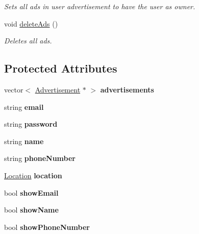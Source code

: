 \begin{DoxyCompactItemize}
\begin{DoxyCompactList}\small\item\em Sets all ads in user advertisement to have the user as owner. \end{DoxyCompactList}\item 
\hypertarget{class_user_a9e9f5d5cc0627f130ff2739ea57d3366}{}void \hyperlink{class_user_a9e9f5d5cc0627f130ff2739ea57d3366}{delete\+Ads} ()\label{class_user_a9e9f5d5cc0627f130ff2739ea57d3366}

\begin{DoxyCompactList}\small\item\em Deletes all ads. \end{DoxyCompactList}\end{DoxyCompactItemize}
\subsection*{Protected Attributes}
\begin{DoxyCompactItemize}
\item 
\hypertarget{class_user_a9a78e0f9ab50c5d9d3041d1d90acd4d8}{}vector$<$ \hyperlink{class_advertisement}{Advertisement} $\ast$ $>$ {\bfseries advertisements}\label{class_user_a9a78e0f9ab50c5d9d3041d1d90acd4d8}

\item 
\hypertarget{class_user_a2d678acd22b533660b4b7d8404961f14}{}string {\bfseries email}\label{class_user_a2d678acd22b533660b4b7d8404961f14}

\item 
\hypertarget{class_user_ab537b9a55bc7d7fcafcdf8e53d085e67}{}string {\bfseries password}\label{class_user_ab537b9a55bc7d7fcafcdf8e53d085e67}

\item 
\hypertarget{class_user_a643f85779a4693855c171c396f49e515}{}string {\bfseries name}\label{class_user_a643f85779a4693855c171c396f49e515}

\item 
\hypertarget{class_user_a727ba647fe019be6fa9c03308d60da9e}{}string {\bfseries phone\+Number}\label{class_user_a727ba647fe019be6fa9c03308d60da9e}

\item 
\hypertarget{class_user_a1c8e68a346c8a47d8cf0e75356c66562}{}\hyperlink{class_location}{Location} {\bfseries location}\label{class_user_a1c8e68a346c8a47d8cf0e75356c66562}

\item 
\hypertarget{class_user_a82dcde625983882667723c4549156db8}{}bool {\bfseries show\+Email}\label{class_user_a82dcde625983882667723c4549156db8}

\item 
\hypertarget{class_user_a0360d5ecb5643df7899cef2c1479bd30}{}bool {\bfseries show\+Name}\label{class_user_a0360d5ecb5643df7899cef2c1479bd30}

\item 
\hypertarget{class_user_af166bac19b9b0b9b85d1b51aaff9cbd9}{}bool {\bfseries show\+Phone\+Number}\label{class_user_af166bac19b9b0b9b85d1b51aaff9cbd9}

\end{DoxyCompactItemize}
